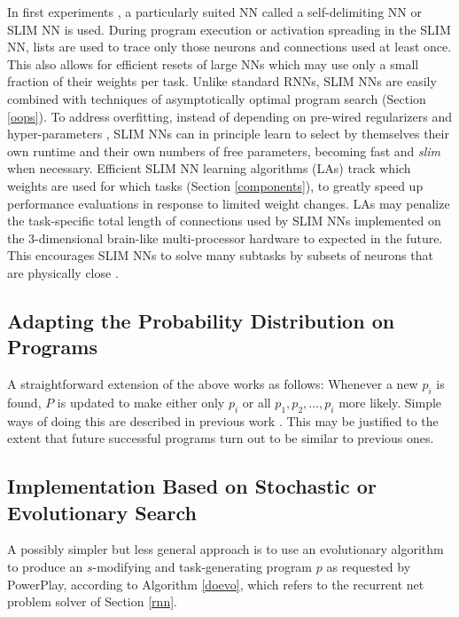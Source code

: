 \documentclass{article}
\begin{document}
In first experiments  \cite{rupesh2012icdl,powerplay2012experiments},
a particularly suited NN called a self-delimiting NN or SLIM NN \cite{Schmidhuber:12slimnn} is used.
During program execution or activation spreading in the SLIM NN, lists are used to trace only those neurons and connections used at least once.
This also allows for efficient resets of large NNs which  may use only a small fraction of their weights per task.
Unlike standard RNNs, 
SLIM NNs are easily combined with techniques of asymptotically optimal program search \cite{Levin:73,Schmidhuber:97bias,Schmidhuber:03nips,Schmidhuber:04oops} 
 (Section \ref{oops}).
To address overfitting, instead of depending on  pre-wired regularizers and hyper-parameters \cite{bishop:2006},
SLIM NNs  can in principle learn to select by themselves their own runtime and their own numbers of free parameters,
 becoming fast and  {\em slim} when necessary.
Efficient SLIM NN learning algorithms (LAs) track which weights are used for which tasks  (Section \ref{components}),
to greatly speed up performance evaluations in response to limited weight changes.
LAs may penalize the task-specific  total length of connections used by 
SLIM NNs implemented on the 3-dimensional brain-like multi-processor hardware to expected in the future.
This  encourages SLIM NNs to solve many subtasks by subsets of neurons that are physically close \cite{Schmidhuber:12slimnn}.








\subsection{Adapting the Probability Distribution on Programs}
A straightforward extension of the above works as follows: Whenever a new
$p_i$ is found, $P$ is updated to make either only $p_i$ or
all $p_1,p_2, \ldots, p_i$ more likely. Simple ways of doing this 
are described in previous work \cite{Schmidhuber:97bias}.
This may be justified to the extent that future successful programs 
turn out to be similar to previous ones.



\subsection{Implementation Based on Stochastic or Evolutionary Search}
\label{evolution}

A possibly simpler but less general approach is to use
an evolutionary algorithm
to produce an $s$-modifying and task-generating program $p$ as requested by {\sc PowerPlay},
according to Algorithm \ref{doevo}, which refers to the recurrent net problem solver of Section \ref{rnn}.
\end{document}
